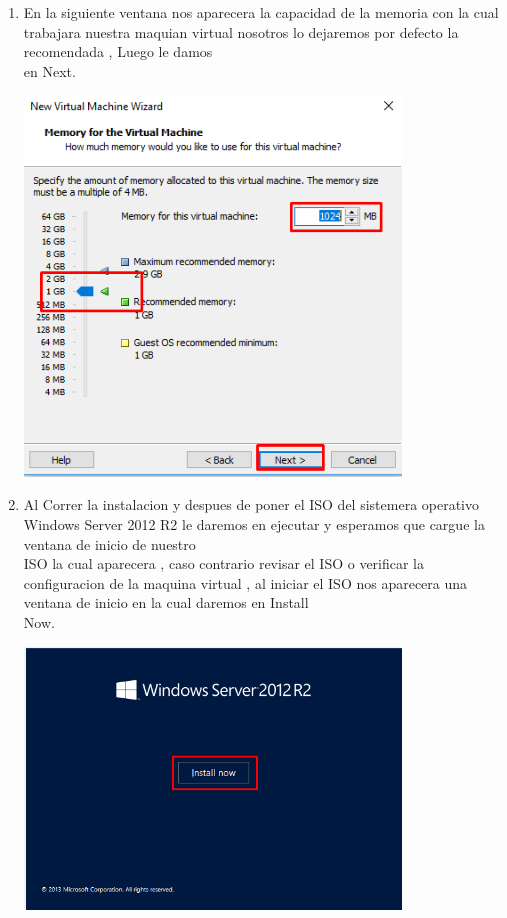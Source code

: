 \begin{enumerate}[1.]
	\item En la siguiente ventana nos aparecera la capacidad de la memoria con la cual trabajara nuestra maquian virtual nosotros lo dejaremos por defecto la recomendada , Luego le damos    		\\en Next.\\
	\begin{center}
	\includegraphics[width=10cm]{./Imagenes/ang5} 
	\end{center}
	

	\item Al Correr la instalacion y despues de poner el ISO del sistemera operativo Windows Server 2012 R2 le daremos en ejecutar y esperamos que cargue la ventana de inicio de nuestro     		\\ISO la cual aparecera , caso contrario revisar el ISO o verificar la configuracion de la maquina virtual , al iniciar el ISO nos aparecera una ventana de inicio en la cual daremos en Install      		\\Now. \\
	\begin{center}
	\includegraphics[width=10cm]{./Imagenes/ang6} 
	\end{center}
	


\end{enumerate}
